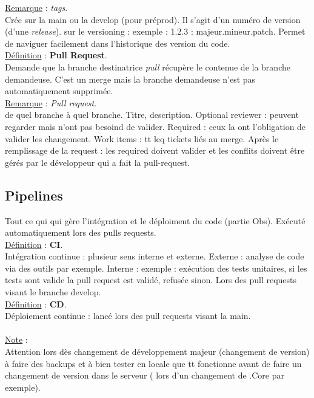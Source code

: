 \documentclass[a4paper,12pt,twoside]{article}
\newcommand{\rem}[2]{\noindent\underline{Remarque} : \textit{#1}.\\ \indent #2}
\newcommand{\note}[1]{\noindent\underline{Note} : \\ \indent #1}
\newcommand{\defi}[2]{\noindent\underline{Définition} : \textbf{#1}.\\ \indent #2}
\begin{document}
\rem{tags}{Crée sur la main ou la develop (pour préprod). Il s'agit d'un numéro de version (d'une \textit{release}). sur le versioning : exemple : 1.2.3 : majeur.mineur.patch. Permet de naviguer facilement dans l'historique des version du code.}\\

\defi{Pull Request}{Demande que la branche destinatrice \textit{pull} récupère le contenue de la branche demandeuse. C'est un merge mais la branche demandeuse n'est pas automatiquement supprimée.}\\

\rem{Pull request}{de quel branche à quel branche. Titre, description. Optional reviewer : peuvent regarder mais n'ont pas besoind de valider. Required : ceux la ont l'obligation de valider les changement. Work items : tt leq tickets liés au merge. Après le remplissage de la request : les required doivent valider et les conflits doivent être gérés par le développeur qui a fait la pull-request.}\\

\subsection{Pipelines}

Tout ce qui qui gère l'intégration et le déploiment du code (partie Obs). Exécuté automatiquement lors des pulls requests.\\

\defi{CI}{Intégration continue : plusieur sens interne et externe. Externe : analyse de code via des outils par exemple. Interne : exemple : exécution des tests unitaires, si les tests sont valide la pull request est validé, refusée sinon. Lors des pull requests visant le branche develop.}\\

\defi{CD}{Déploiement continue : lancé lors des pull requests visant la main.}\\

\\

\note{Attention lors dès changement de développement majeur (changement de version) à faire des backups et à bien tester en locale que tt fonctionne avant de faire un changement de version dans le serveur ( lors d'un changement de .Core par exemple).}\\
\end{document}
